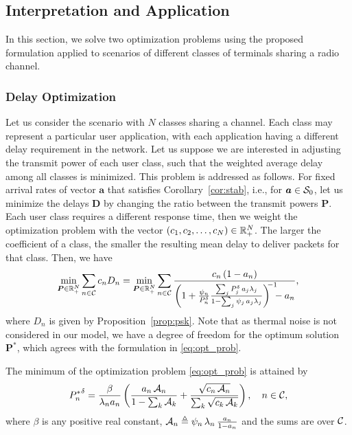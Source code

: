 \subsection{Interpretation and Application}
\label{sec:application}

In this section, we solve two optimization problems using the proposed formulation applied to scenarios of different classes of terminals sharing a radio channel.

\subsubsection{Delay Optimization}
\label{ssec:opt_delay}

Let us consider the scenario with $N$ classes sharing a channel. Each class may represent a particular user application, with each application having a different delay requirement in the network.
%
Let us suppose we are interested in adjusting the transmit power of each user class, such that the weighted average delay among all classes is minimized.
%
This problem is addressed as follows. For fixed arrival rates of vector $\bm{a}$ that satisfies Corollary~\ref{cor:stab}, i.e., for $\bm{a}\in\cal{S}_0$, let us minimize the delays $\bm{D}$ by changing the ratio between the transmit powers $\bm{P}$.
%
Each user class requires a different response time, then we weight the optimization problem with the vector $(c_1,c_2,\dots,c_N) \in \R_+^N$. The larger the coefficient of a class, the smaller the resulting mean delay to deliver packets for that class. Then, we have
\begin{equation} \label{eq:opt_prob}
	\min_{\bm{P}\in\R_+^N} \sum_{n\in\cal{C}} c_n D_n
    = \min_{\bm{P}\in\R_+^N} \sum_{n\in\cal{C}} \frac{c_n\,(1-a_n)}
        	{\left( 1 + \frac{\psi_n}{P_n^\delta}
        	\frac{\sum_j P_j^\delta\,a_j\lambda_j}
        	{1 - \sum_j \psi_j\,a_j\lambda_j} \right)^{\hspace{-1mm}-1}\!\!\! - a_n},
\end{equation}
where $D_n$ is given by Proposition~\ref{prop:psk}. Note that as thermal noise is not considered in our model, we have a degree of freedom for the optimum solution $\bm{P}^*$, which agrees with the formulation in \eqref{eq:opt_prob}.

\begin{proposition} \label{prop:opt}
	The minimum of the optimization problem \eqref{eq:opt_prob} is attained by
    \begin{equation} \label{eq:opt_D}
        {P_n^*}^\delta
        	= \dfrac{\beta}{\lambda_n a_n} \left( \frac{a_n\,\cal{A}_n}
            {1 - \sum_{k} \cal{A}_k }
            + \frac{\sqrt{c_n\,\cal{A}_n}}
            { \sum_{k} \sqrt{c_k\,\cal{A}_k } } \right), \quad n\in\cal{C},
    \end{equation}
    where $\beta$ is any positive real constant, $\cal{A}_n \triangleq \psi_n\,\lambda_n\,\frac{a_n}{1-a_n}$ and the sums are over $\cal{C}$.
\end{proposition}

